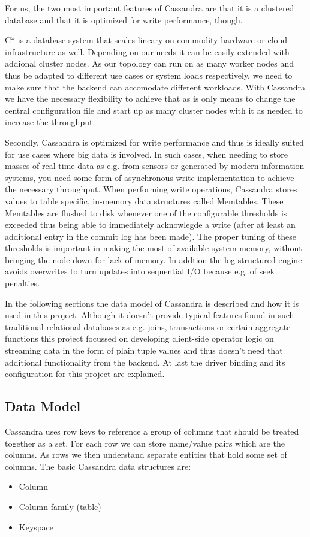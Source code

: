 For us, the two most important features of Cassandra are that it is a clustered database and that it is optimized for write performance, though.

C* is a database system that scales lineary on commodity hardware or cloud infrastructure as well. Depending on our needs it can be easily extended with addional cluster nodes. As our topology can run on as many worker nodes and thus be adapted to different use cases or system loads respectively, we need to make sure that the backend can accomodate different workloads. With Cassandra we have the necessary flexibility to achieve that as is only means to change the central configuration file and start up as many cluster nodes with it as needed to increase the throughput.

Secondly, Cassandra is optimized for write performance and thus is ideally suited for use cases where big data is involved. In such cases, when needing to store masses of real-time data as e.g. from sensors or generated by modern information systems, you need some form of asynchronous write implementation to achieve the necessary throughput. When performing write operations, Cassandra stores values to table specific, in-memory data structures called Memtables. These Memtables are flushed to disk whenever one of the configurable thresholds is exceeded thus being able to immediately acknowlegde a write (after at least an additional entry in the commit log has been made). The proper tuning of these thresholds is important in making the most of available system memory, without bringing the node down for lack of memory. In addtion the log-structured engine avoids overwrites to turn updates into sequential I/O because e.g. of seek penalties.

In the following sections the data model of Cassandra is described and how it is used in this project. Although it doesn't provide typical features found in such traditional relational databases as e.g. joins, transactions or certain aggregate functions this project focussed on developing client-side operator logic on streaming data in the form of plain tuple values and thus doesn't need that additional functionality from the backend. At last the driver binding and its configuration for this project are explained.

\subsection{Data Model}
\label{sect:model}
Cassandra uses row keys to reference a group of columns that should be treated together as a set. For each row we can store name/value pairs which are the columns. As rows we then understand separate entities that hold some set of columns. The basic Cassandra data structures are:
\begin{itemize}
  \item Column
  \item Column family (table)
  \item Keyspace
\end{itemize} 

